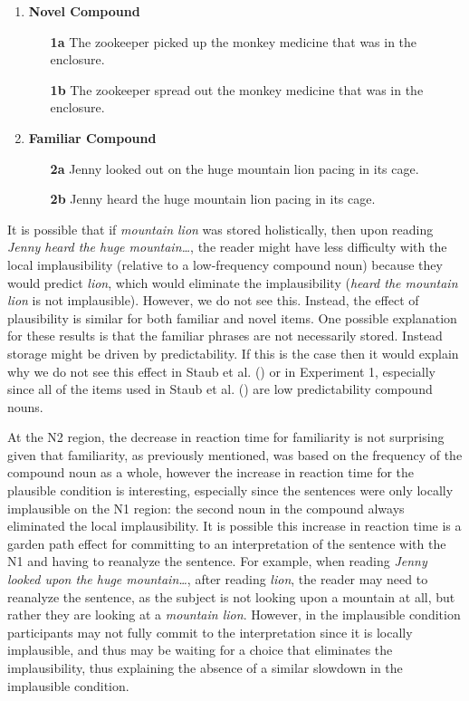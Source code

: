\documentclass[
  12pt,
  letterpaper,
]{scrreprt}
\begin{document}
\begin{enumerate}
   \item \textbf{Novel Compound}
    \begin{enumerate}
        \item[\textbf{1a}] The zookeeper picked up the monkey medicine that was in the enclosure.
        \item[\textbf{1b}] The zookeeper spread out the monkey medicine that was in the enclosure.
    \end{enumerate} \label{staubsentencenovel}
    \item \textbf{Familiar Compound}
    \begin{enumerate}
        \item[\textbf{2a}] Jenny looked out on the huge mountain lion pacing in its cage. \label{familiarplaus}
        \item[\textbf{2b}] Jenny heard the huge mountain lion pacing in its cage. \label{familiarimplaus}
    \end{enumerate} \label{figanext}
\end{enumerate}

It is possible that if \emph{mountain lion} was stored holistically,
then upon reading \emph{Jenny heard the huge mountain\ldots{}}, the
reader might have less difficulty with the local implausibility
(relative to a low-frequency compound noun) because they would predict
\emph{lion}, which would eliminate the implausibility (\emph{heard the
mountain lion} is not implausible). However, we do not see this.
Instead, the effect of plausibility is similar for both familiar and
novel items. One possible explanation for these results is that the
familiar phrases are not necessarily stored. Instead storage might be
driven by predictability. If this is the case then it would explain why
we do not see this effect in Staub et al.
() or in Experiment
1, especially since all of the items used in Staub et al.
() are low
predictability compound nouns.

At the N2 region, the decrease in reaction time for familiarity is not
surprising given that familiarity, as previously mentioned, was based on
the frequency of the compound noun as a whole, however the increase in
reaction time for the plausible condition is interesting, especially
since the sentences were only locally implausible on the N1 region: the
second noun in the compound always eliminated the local implausibility.
It is possible this increase in reaction time is a garden path effect
for committing to an interpretation of the sentence with the N1 and
having to reanalyze the sentence. For example, when reading \emph{Jenny
looked upon the huge mountain\ldots{}}, after reading \emph{lion}, the
reader may need to reanalyze the sentence, as the subject is not looking
upon a mountain at all, but rather they are looking at a \emph{mountain
lion}. However, in the implausible condition participants may not fully
commit to the interpretation since it is locally implausible, and thus
may be waiting for a choice that eliminates the implausibility, thus
explaining the absence of a similar slowdown in the implausible
condition.
\end{document}
